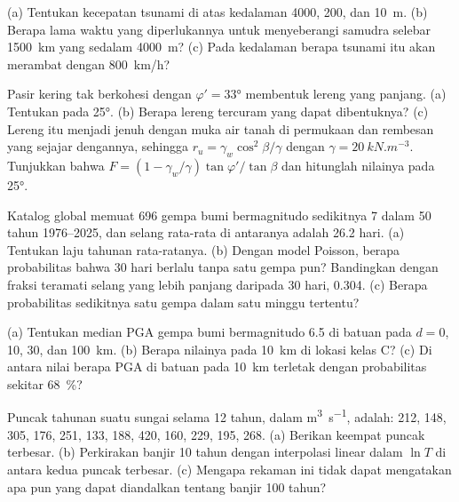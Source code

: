 \begin{exercise}[$\star$]\label{exo:b2:geological-hazards:3}
(a) Tentukan kecepatan tsunami di atas kedalaman 4000, 200, dan \qty{10}{m}. (b) Berapa lama waktu yang diperlukannya
untuk menyeberangi samudra selebar \qty{1500}{km} yang sedalam \qty{4000}{m}? (c) Pada kedalaman berapa tsunami itu akan merambat dengan
\qty{800}{km/h}?
\end{exercise}

\begin{exercise}[$\star$]\label{exo:b2:geological-hazards:4}
Pasir kering tak berkohesi dengan $\varphi' = \ang{33}$ membentuk lereng yang panjang. (a) Tentukan  pada \ang{25}. (b) Berapa lereng tercuram yang dapat dibentuknya? (c) Lereng itu menjadi jenuh dengan
muka air tanah di permukaan dan rembesan yang sejajar dengannya, sehingga $r_u = \gamma_w\cos^2\beta/\gamma$
dengan $\gamma = \qty{20}{kN.m^{-3}}$. Tunjukkan bahwa $F = (1 - \gamma_w/\gamma)\tan\varphi'/\tan\beta$ dan
hitunglah nilainya pada \ang{25}.
\end{exercise}

\begin{exercise}[$\star\star$]\label{exo:b2:geological-hazards:5}
Katalog global memuat 696 gempa bumi bermagnitudo sedikitnya 7 dalam 50 tahun 1976--2025, dan
selang rata-rata di antaranya adalah 26.2 hari. (a) Tentukan laju tahunan rata-ratanya. (b) Dengan model
Poisson, berapa probabilitas bahwa 30 hari berlalu tanpa satu gempa pun? Bandingkan dengan fraksi teramati
selang yang lebih panjang daripada 30 hari, 0.304. (c) Berapa probabilitas sedikitnya satu gempa dalam
satu minggu tertentu?
\end{exercise}

\begin{exercise}[$\star\star$]\label{exo:b2:geological-hazards:6}
(a) Tentukan median PGA gempa bumi bermagnitudo 6.5 di batuan pada $d = 0$, 10, 30, dan
\qty{100}{km}. (b) Berapa nilainya pada \qty{10}{km} di lokasi kelas C? (c) Di antara nilai berapa
PGA di batuan pada \qty{10}{km} terletak dengan probabilitas sekitar \qty{68}{\percent}?
\end{exercise}

\begin{exercise}[$\star\star$]\label{exo:b2:geological-hazards:7}
Puncak tahunan suatu sungai selama 12 tahun, dalam \unit{m^3.s^{-1}}, adalah: 212, 148, 305, 176, 251, 133, 188,
420, 160, 229, 195, 268. (a) Berikan  keempat puncak terbesar. (b) Perkirakan banjir 10
tahun dengan interpolasi linear dalam $\ln T$ di antara kedua puncak terbesar. (c) Mengapa rekaman ini tidak dapat mengatakan
apa pun yang dapat diandalkan tentang banjir 100 tahun?
\end{exercise}

